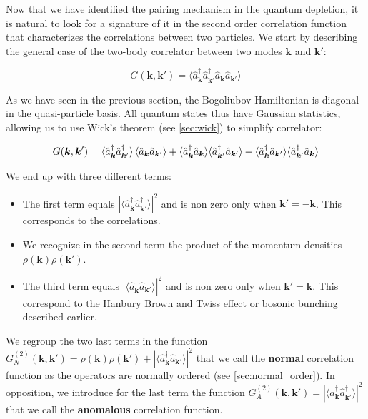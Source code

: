 \label{sec:2nd_order_bogo}

Now that we have identified the \kmk pairing mechanism in the quantum depletion, it is natural to look for a signature of it in the second order correlation function that characterizes the correlations between two particles. We start by describing the general case of the two-body correlator between two modes $\bm{k}$ and $\bm{k'}$:

\begin{equation}
    G(\bm{k},\bm{k}')=\langle \hat{a}^{\dagger}_{\bm{k}} \hat{a}^{\dagger}_{\bm k'} \hat{a}_{\bm k} \hat{a}_{\bm {k}'} \rangle
\end{equation}

As we have seen in the previous section, the Bogoliubov Hamiltonian is diagonal in the quasi-particle basis. All quantum states thus have Gaussian statistics, allowing us to use Wick's theorem (see \ref{sec:wick}) to simplify correlator:

\begin{equation}
    G(\bm{k},\bm{k}')=\langle \hat{a}^{\dagger}_{\bm k} \hat{a}^{\dagger}_{\bm {k}'} \rangle \left\langle\hat{a}_{\bm k} \hat{a}_{\bm {k}'}\right\rangle + \langle \hat{a}^{\dagger}_{\bm k} \hat{a}_{\bm k} \rangle \langle \hat{a}^{\dagger}_{\bm {k}'} \hat{a}_{\bm {k}'} \rangle + \langle \hat{a}^{\dagger}_{\bm k} \hat{a}_{\bm {k}'} \rangle \langle \hat{a}^{\dagger}_{\bm {k}'} \hat{a}_{\bm k} \rangle
    \label{eq:wick_bogo}
\end{equation}

We end up with three different terms:

\begin{itemize}
    \item The first term equals $| \langle \hat{a}^{\dagger}_{\bm k} \hat{a}^{\dagger}_{\bm {k}'} \rangle |^2$ and is non zero only when $\bm{k}'=-\bm{k}$. This corresponds to the \kmk correlations.
    \item We recognize in the second term the product of the momentum densities $\rho(\bm{k}) \rho(\bm{k}')$.
    \item The third term equals $| \langle \hat{a}^{\dagger}_{\bm k} \hat{a}_{\bm {k}'} \rangle |^2$ and is non zero only when $\bm{k}'=\bm{k}$. This correspond to the Hanbury Brown and Twiss effect or bosonic bunching described earlier.
\end{itemize}

\noindent We regroup the two last terms in the function $G^{(2)}_{N}({\bm k},{\bm k}')= \rho({\bm k})\rho({\bm k}') + | \langle \hat{a}^{\dagger}_{\bm k} \hat{a}_{\bm {k}'} \rangle |^2$ that we call the \textbf{normal} correlation function as the operators are normally ordered (see \ref{sec:normal_order}). In opposition, we introduce for the last term the function $G^{(2)}_{A}({\bm k},{\bm k}')=| \langle \hat{a}^{\dagger}_{\bm k} \hat{a}^{\dagger}_{\bm {k}'} \rangle |^2 $ that we call the \textbf{anomalous} correlation function. 

